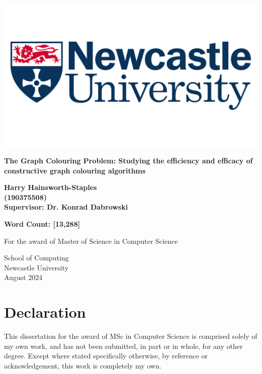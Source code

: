 \documentclass[11pt]{report}
\begin{document}
\begin{titlepage}
    \begin{center}
        \includegraphics[scale=0.07]{Components/Newcastle-University-Logo.png}    

        \LARGE
        \textbf{The Graph Colouring Problem: Studying the efficiency and efficacy of constructive graph colouring algorithms}   
        \vspace{1.5cm}

        \Large 
        \textbf{Harry Hainsworth-Staples \\ (190375508)}  \\ 
        \vspace{0.5cm}
        \textbf{Supervisor: Dr. Konrad Dabrowski}
        
            
        \vfill
        
        \textbf{Word Count: [13,288]} 
        \vspace{0.5cm}

        For the award of Master of Science in Computer Science
            
        \vspace{0.5cm}
        
        School of Computing\\
        Newcastle University\\
        August 2024
            
    \end{center}
\end{titlepage}
\newpage

\section*{Declaration}
This dissertation for the award of MSc in Computer Science is comprised solely of my own work, and has not been submitted, in part or in whole, for any other degree. Except where stated specifically otherwise, by reference or acknowledgement, this work is completely my own.
\end{document}
